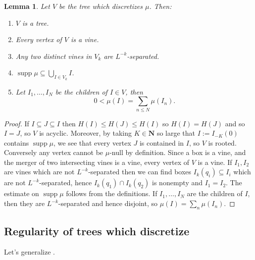 \documentclass[reqno,10pt]{amsart}
\newcommand{\NN}{\mathbf{N}}
\DeclareMathOperator{\supp}{supp}
\newtheorem{lemma}[theorem]{Lemma}
\theoremstyle{definition}
\numberwithin{equation}{section}
\begin{document}
\begin{lemma}
Let $V$ be the tree which discretizes $\mu$. Then:
\begin{enumerate}
\item $V$ is a tree.
\item Every vertex of $V$ is a vine.
\item Any two distinct vines in $V_k$ are $L^{-k}$-separated.
\item $\supp \mu \subseteq \bigcup_{I \in V_k} I$.
\item Let $I_1, \dots, I_N$ be the children of $I \in V$, then
$$0 < \mu(I) = \sum_{n \leq N} \mu(I_n).$$
\end{enumerate}
\end{lemma}
\begin{proof}
If $I \subseteq J \subseteq I$ then $H(I) \leq H(J) \leq H(I)$ so $H(I) = H(J)$ and so $I = J$, so $V$ is acyclic.
Moreover, by taking $K \in \NN$ so large that $I := I_{-K}(0)$ contains $\supp \mu$, we see that every vertex $J$ is contained in $I$, so $V$ is rooted.
Conversely any vertex cannot be $\mu$-null by definition.
Since a box is a vine, and the merger of two intersecting vines is a vine, every vertex of $V$ is a vine.
If $I_1, I_2$ are vines which are not $L^{-k}$-separated then we can find boxes $I_k(q_i) \subseteq I_i$ which are not $L^{-k}$-separated, hence $I_k(q_1) \cap I_k(q_2)$ is nonempty and $I_1 = I_2$.
The estimate on $\supp \mu$ follows from the definitions.
If $I_1, \dots, I_N$ are the children of $I$, then they are $L^{-k}$-separated and hence disjoint, so $\mu(I) = \sum_n \mu(I_n)$.
\end{proof} 

\subsection{Regularity of trees which discretize}
Let's generalize \cite[Lemma 2.1]{Dyatlov_2018}.
\end{document}
